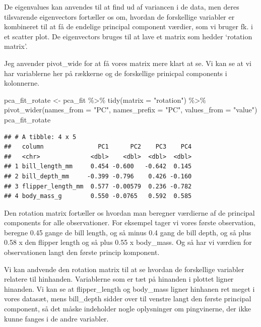 \documentclass[
]{book}
\newenvironment{Shaded}{\begin{snugshade}}{\end{snugshade}}
\newcommand{\AttributeTok}[1]{\textcolor[rgb]{0.77,0.63,0.00}{#1}}
\newcommand{\FunctionTok}[1]{\textcolor[rgb]{0.00,0.00,0.00}{#1}}
\newcommand{\NormalTok}[1]{#1}
\newcommand{\OtherTok}[1]{\textcolor[rgb]{0.56,0.35,0.01}{#1}}
\newcommand{\SpecialCharTok}[1]{\textcolor[rgb]{0.00,0.00,0.00}{#1}}
\newcommand{\StringTok}[1]{\textcolor[rgb]{0.31,0.60,0.02}{#1}}
\begin{document}
De eigenvalues kan anvendes til at find ud af variancen i de data, men deres tilsvarende eigenvectors fortæller os om, hvordan de forskellige variabler er kombineret til at få de endelige principal component værdier, som vi bruger fk. i et scatter plot. De eigenvectors bruges til at lave et matrix som hedder `rotation matrix'.

Jeg anvender pivot\_wide for at få vores matrix mere klart at se. Vi kan se at vi har variablerne her på rækkerne og de forskellige prinicpal components i kolonnerne.

\begin{Shaded}
\begin{Highlighting}[]
\NormalTok{pca\_fit\_rotate }\OtherTok{\textless{}{-}}\NormalTok{ pca\_fit }\SpecialCharTok{\%\textgreater{}\%}
  \FunctionTok{tidy}\NormalTok{(}\AttributeTok{matrix =} \StringTok{"rotation"}\NormalTok{) }\SpecialCharTok{\%\textgreater{}\%} 
  \FunctionTok{pivot\_wider}\NormalTok{(}\AttributeTok{names\_from =} \StringTok{"PC"}\NormalTok{, }\AttributeTok{names\_prefix =} \StringTok{"PC"}\NormalTok{, }\AttributeTok{values\_from =} \StringTok{"value"}\NormalTok{)}
\NormalTok{pca\_fit\_rotate}
\end{Highlighting}
\end{Shaded}

\begin{verbatim}
## # A tibble: 4 x 5
##   column               PC1      PC2    PC3    PC4
##   <chr>              <dbl>    <dbl>  <dbl>  <dbl>
## 1 bill_length_mm     0.454 -0.600   -0.642  0.145
## 2 bill_depth_mm     -0.399 -0.796    0.426 -0.160
## 3 flipper_length_mm  0.577 -0.00579  0.236 -0.782
## 4 body_mass_g        0.550 -0.0765   0.592  0.585
\end{verbatim}

Den rotation matrix fortæller os hvordan man beregner værdierne af de principal components for alle observationer. For eksempel tager vi vores første observation, beregne 0.45 gange de bill length, og så minus 0.4 gang de bill depth, og så plus 0.58 x den flipper length og så plus 0.55 x body\_mass. Og så har vi værdien for observationen langt den første princip komponent.

Vi kan andvende den rotation matrix til at se hvordan de forskellige variabler relatere til hinhanden. Variablerne som er tæt på hinanden i plottet ligner hinanden. Vi kan se at flipper\_length og body\_mass ligner hinhanen ret meget i vores datasæt, mens bill\_depth sidder over til venstre langt den første principal component, så det måske indeholder nogle oplysninger om pingvinerne, der ikke kunne fanges i de andre variabler.
\end{document}
